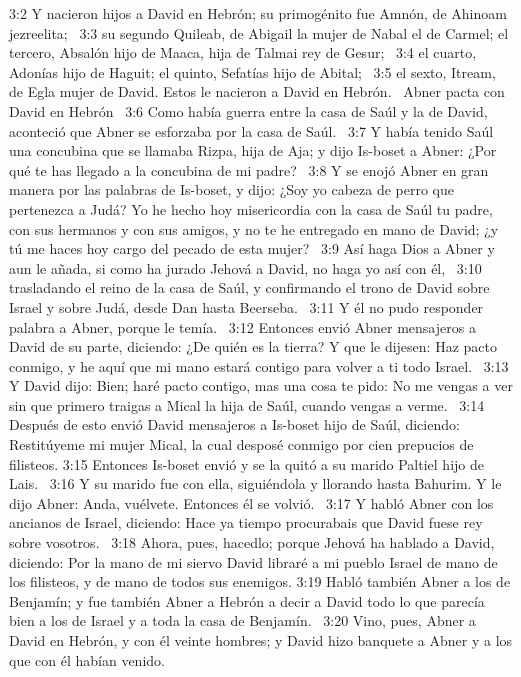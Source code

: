 3:2 Y nacieron hijos a David en Hebrón; su primogénito fue Amnón, de Ahinoam jezreelita;  
3:3 su segundo Quileab, de Abigail la mujer de Nabal el de Carmel; el tercero, Absalón hijo de Maaca, hija de Talmai rey de Gesur;  
3:4 el cuarto, Adonías hijo de Haguit; el quinto, Sefatías hijo de Abital;  
3:5 el sexto, Itream, de Egla mujer de David. Estos le nacieron a David en Hebrón.  
Abner pacta con David en Hebrón  
3:6 Como había guerra entre la casa de Saúl y la de David, aconteció que Abner se esforzaba por la casa de Saúl.  
3:7 Y había tenido Saúl una concubina que se llamaba Rizpa, hija de Aja; y dijo Is-boset a Abner: ¿Por qué te has llegado a la concubina de mi padre?  
3:8 Y se enojó Abner en gran manera por las palabras de Is-boset, y dijo: ¿Soy yo cabeza de perro que pertenezca a Judá? Yo he hecho hoy misericordia con la casa de Saúl tu padre, con sus hermanos y con sus amigos, y no te he entregado en mano de David; ¿y tú me haces hoy cargo del pecado de esta mujer?  
3:9 Así haga Dios a Abner y aun le añada, si como ha jurado Jehová a David, no haga yo así con él,  
3:10 trasladando el reino de la casa de Saúl, y confirmando el trono de David sobre Israel y sobre Judá, desde Dan hasta Beerseba.  
3:11 Y él no pudo responder palabra a Abner, porque le temía.  
3:12 Entonces envió Abner mensajeros a David de su parte, diciendo: ¿De quién es la tierra? Y que le dijesen: Haz pacto conmigo, y he aquí que mi mano estará contigo para volver a ti todo Israel.  
3:13 Y David dijo: Bien; haré pacto contigo, mas una cosa te pido: No me vengas a ver sin que primero traigas a Mical la hija de Saúl, cuando vengas a verme.  
3:14 Después de esto envió David mensajeros a Is-boset hijo de Saúl, diciendo: Restitúyeme mi mujer Mical, la cual desposé conmigo por cien prepucios de filisteos. 
3:15 Entonces Is-boset envió y se la quitó a su marido Paltiel hijo de Lais.  
3:16 Y su marido fue con ella, siguiéndola y llorando hasta Bahurim. Y le dijo Abner: Anda, vuélvete. Entonces él se volvió.  
3:17 Y habló Abner con los ancianos de Israel, diciendo: Hace ya tiempo procurabais que David fuese rey sobre vosotros.  
3:18 Ahora, pues, hacedlo; porque Jehová ha hablado a David, diciendo: Por la mano de mi siervo David libraré a mi pueblo Israel de mano de los filisteos, y de mano de todos sus enemigos. 
3:19 Habló también Abner a los de Benjamín; y fue también Abner a Hebrón a decir a David todo lo que parecía bien a los de Israel y a toda la casa de Benjamín.  
3:20 Vino, pues, Abner a David en Hebrón, y con él veinte hombres; y David hizo banquete a Abner y a los que con él habían venido.  
